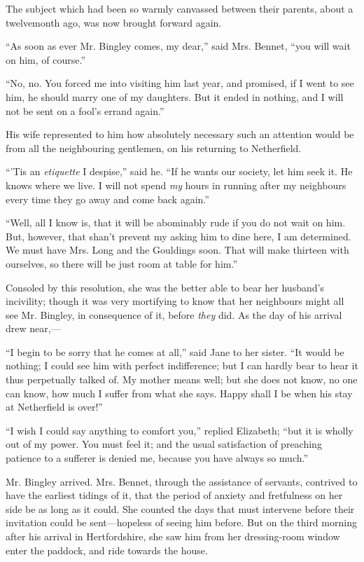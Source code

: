 \documentclass[12pt,openright]{book}
\begin{document}
The subject which had been so warmly canvassed between their parents, about a twelvemonth ago, was now brought forward again.

“As soon as ever Mr. Bingley comes, my dear,” said Mrs. Bennet, “you will wait on him, of course.”

“No, no. You forced me into visiting him last year, and promised, if I went to see him, he should marry one of my daughters. But it ended in nothing, and I will not be sent on a fool’s errand again.”

His wife represented to him how absolutely necessary such an attention would be from all the neighbouring gentlemen, on his returning to Netherfield.

“’Tis an \textit{etiquette} I despise,” said he. “If he wants our society, let him seek it. He knows where we live. I will not spend \textit{my} hours in running after my neighbours every time they go away and come back again.”

“Well, all I know is, that it will be abominably rude if you do not wait on him. But, however, that shan’t prevent my asking him to dine here, I am determined. We must have Mrs. Long and the Gouldings soon. That will make thirteen with ourselves, so there will be just room at table for him.”

Consoled by this resolution, she was the better able to bear her husband’s incivility; though it was very mortifying to know that her neighbours might all see Mr. Bingley, in consequence of it, before \textit{they} did. As the day of his arrival drew near,—

“I begin to be sorry that he comes at all,” said Jane to her sister. “It would be nothing; I could see him with perfect indifference; but I can hardly bear to hear it thus perpetually talked of. My mother means well; but she does not know, no one can know, how much I suffer from what she says. Happy shall I be when his stay at Netherfield is over!”

“I wish I could say anything to comfort you,” replied Elizabeth; “but it is wholly out of my power. You must feel it; and the usual satisfaction of preaching patience to a sufferer is denied me, because you have always so much.”

Mr. Bingley arrived. Mrs. Bennet, through the assistance of servants, contrived to have the earliest tidings of it, that the period of anxiety and fretfulness on her side be as long as it could. She counted the days that must intervene before their invitation could be sent—hopeless of seeing him before. But on the third morning after his arrival in Hertfordshire, she saw him from her dressing-room window enter the paddock, and ride towards the house.
\end{document}
